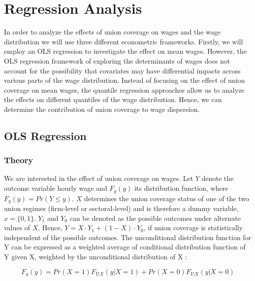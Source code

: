 \section{Regression Analysis}\label{Sec:Regression}

In order to analyze the effects of union coverage on wages and the wage distribution we will use three different econometric frameworks. Firstly, we will employ an OLS regression to investigate the effect on mean wages. However, the OLS regression framework of exploring the determinants of wages does not account for the possibility that covariates may have differential impacts across various parts of the wage distribution. Instead of focusing on the effect of union coverage on mean wages, the quantile regression approaches allow us to analyze the effects on different quantiles of the wage distribution. Hence, we can determine the contribution of union coverage to wage dispersion.

\subsection{OLS Regression}\label{SubSec:OLS}

\subsubsection{Theory}
We are interested in the effect of union coverage on wages. Let $ Y $ denote the outcome variable hourly wage and $ F_y(y) $ its distribution function, where $ F_y(y)=Pr(Y\leq y) $. $ X $ determines the union coverage status of one of the two union regimes (firm-level or sectoral-level) and is therefore a dummy variable, $ x= \{0,1\}$. $ Y_1 $ and $ Y_0 $ can be denoted as the possible outcomes under alternate values of $ X $. Hence, $Y=X\cdot Y_1 + (1-X)\cdot Y_0$, if union coverage is statistically independent of the possible outcomes. The unconditional distribution function for Y can be expressed as a weighted average of conditional distribution function of Y given X, weighted by the unconditional distribution of X \citep{Borah&Basu:2013}:

\begin{equation}\label{1}
  F_{y}(y)=Pr(X=1)F_{Y|X}(y|X=1) + Pr(X=0)F_{Y|X}(y|X=0)
\end{equation}

